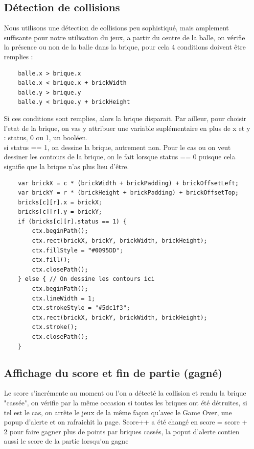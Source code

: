 \documentclass[12pt]{exam}
\begin{document}
\subsection{Détection de collisions}
Nous utilisons une détection de collisions peu sophistiqué, mais amplement suffisante pour notre utilisation du jeux, a partir du centre de la balle, on vérifie la présence ou non de la balle dans la brique, pour cela 4 conditions doivent être remplies :
\begin{verbatim}
    balle.x > brique.x 
    balle.x < brique.x + brickWidth
    balle.y > brique.y
    balle.y < brique.y + brickHeight
\end{verbatim}
Si ces conditions sont remplies, alors la brique disparait.
Par ailleur, pour choisir l'etat de la brique, on vas y attribuer une variable suplémentaire en plus de x et y : status, 0 ou 1, un booléen.\\
si status == 1, on dessine la brique, autrement non. Pour le cas ou on veut dessiner les contours de la brique, on le fait lorsque status == 0 puisque cela signifie que la brique n'as plus lieu d'être.
\newpage
\begin{verbatim}
    var brickX = c * (brickWidth + brickPadding) + brickOffsetLeft;
    var brickY = r * (brickHeight + brickPadding) + brickOffsetTop;
    bricks[c][r].x = brickX;
    bricks[c][r].y = brickY;
    if (bricks[c][r].status == 1) {
        ctx.beginPath();
        ctx.rect(brickX, brickY, brickWidth, brickHeight);
        ctx.fillStyle = "#0095DD";
        ctx.fill();
        ctx.closePath();
    } else { // On dessine les contours ici
        ctx.beginPath();
        ctx.lineWidth = 1;
        ctx.strokeStyle = "#5dc1f3";
        ctx.rect(brickX, brickY, brickWidth, brickHeight);
        ctx.stroke();
        ctx.closePath();
    }
\end{verbatim}

\subsection{Affichage du score et fin de partie (gagné)}
Le score s'incrémente au moment ou l'on a détecté la collision et rendu la brique "cassée", on vérifie par la même occasion si toutes les briques ont été détruites, si tel est le cas, on arrête le jeux de la même façon qu'avec le Game Over, une popup d'alerte et on rafraichit la page. Score++ a été changé en score = score + 2 pour faire gagner plus de points par briques cassés, la poput d'alerte contien aussi le score de la partie lorsqu'on gagne
\end{document}
